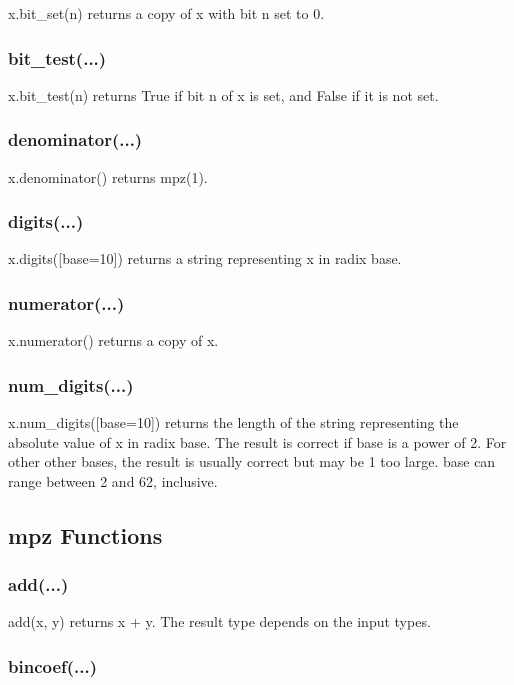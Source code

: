 x.bit\_set(n) returns a copy of x with bit n set to 0.

\subsubsection{bit\_test(...)}

x.bit\_test(n) returns True if bit n of x is set, and False if it is not set.

\subsubsection{denominator(...)}

x.denominator() returns mpz(1).

\subsubsection{digits(...)}

x.digits([base=10]) returns a string representing x in radix base.

\subsubsection{numerator(...)}

x.numerator() returns a copy of x.

\subsubsection{num\_digits(...)}

x.num\_digits([base=10]) returns the length of the string representing the absolute value of x in radix base. The result is correct if base is a power of 2. For other other bases, the result is usually correct but may be 1 too large. base can range between 2 and 62, inclusive.



\subsection{mpz Functions}

\subsubsection{add(...)}

add(x, y) returns x + y. The result type depends on the input types.

\subsubsection{bincoef(...)}

